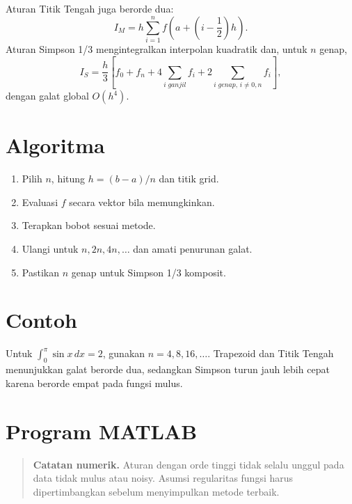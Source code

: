 \documentclass[book,english,noindex,lean,nobackpage,nocopyright,noupdate,nofiglist,notablist]{enacom}
\newcommand{\Note}[1]{\begin{quote}\textbf{Catatan numerik.} #1\end{quote}}
\begin{document}
Aturan Titik Tengah juga berorde dua:
\begin{equation}
I_M=h\sum_{i=1}^{n} f\left(a+\left(i-\frac12\right)h\right).
\end{equation}
Aturan Simpson 1/3 mengintegralkan interpolan kuadratik dan, untuk $n$ genap,
\begin{equation}
I_S=\frac{h}{3}\left[f_0+f_n+4\sum_{i\;ganjil}f_i+2\sum_{i\;genap,\,i\ne 0,n}f_i\right],
\end{equation}
dengan galat global $O(h^4)$.

\section{Algoritma}
\begin{enumerate}
\item Pilih $n$, hitung $h=(b-a)/n$ dan titik grid.
\item Evaluasi $f$ secara vektor bila memungkinkan.
\item Terapkan bobot sesuai metode.
\item Ulangi untuk $n,2n,4n,\ldots$ dan amati penurunan galat.
\item Pastikan $n$ genap untuk Simpson 1/3 komposit.
\end{enumerate}

\section{Contoh}
Untuk $\int_0^\pi\sin x\,dx=2$, gunakan $n=4,8,16,\ldots$. Trapezoid dan Titik Tengah menunjukkan galat berorde dua, sedangkan Simpson turun jauh lebih cepat karena berorde empat pada fungsi mulus.

\section{Program MATLAB}





\Note{Aturan dengan orde tinggi tidak selalu unggul pada data tidak mulus atau noisy. Asumsi regularitas fungsi harus dipertimbangkan sebelum menyimpulkan metode terbaik.}
\end{document}
